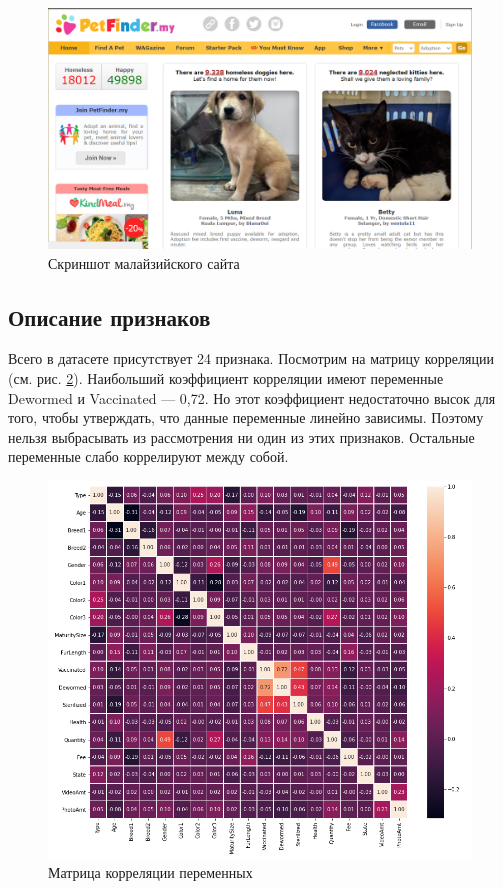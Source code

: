 \documentclass[14pt]{mmcs_article}
\begin{document}
\begin{figure}[H]
	\centering
	\includegraphics[scale=0.4]{petfinder.png}
	\caption{Скриншот малайзийского сайта}\label{analyse:petfinder}
\end{figure}


\subsection{Описание признаков}

Всего в датасете присутствует 24 признака. Посмотрим на матрицу корреляции (см. рис. \ref{analyse:corr}). Наибольший коэффициент корреляции имеют переменные Dewormed и Vaccinated --- 0,72. Но этот коэффициент недостаточно высок для того, чтобы утверждать, что данные переменные линейно зависимы. Поэтому нельзя выбрасывать из рассмотрения ни один из этих признаков. Остальные переменные слабо коррелируют между собой.

\begin{figure}[H]
	\centering
	\includegraphics[scale=0.55]{corr.png}
	\caption{Матрица корреляции переменных}\label{analyse:corr}
\end{figure}
\end{document}
